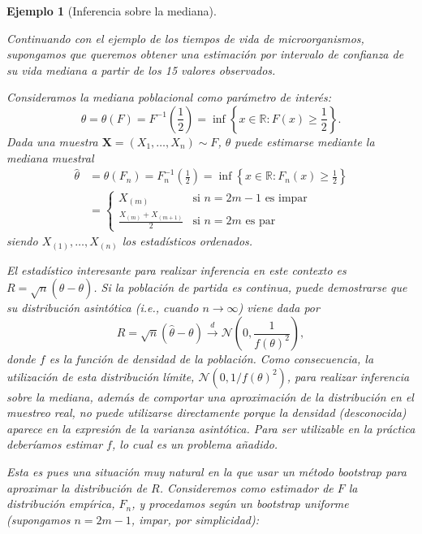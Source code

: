\documentclass[
]{book}
\renewcommand{\mathbf}[1]{\symbf{#1}}
\theoremstyle{break}
\newtheorem{example}{Ejemplo}[chapter]
\theoremstyle{nonumberplain}
\begin{document}
\begin{example}[Inferencia sobre la mediana]
\protect\hypertarget{exm:mediana}{}\label{exm:mediana} \vspace{0.5cm}

Continuando con el ejemplo de los tiempos de vida de microorganismos,
supongamos que queremos obtener una estimación por intervalo de confianza
de su vida mediana a partir de los 15 valores observados.

Consideramos la mediana poblacional como parámetro de interés:
\[\theta = \theta \left( F \right) = F^{-1}\left( \frac{1}{2} \right) 
= \inf \left\{ x\in \mathbb{R} : F\left( x \right) \geq \frac{1}{2}\right\}.\]
Dada una muestra \(\mathbf{X}=\left( X_1,\ldots ,X_n \right) \sim
F\), \(\theta\) puede estimarse mediante la mediana muestral
\[\begin{aligned}
\hat{\theta} &= \theta \left( F_n \right) =F_n^{-1}\left( \frac{1}{2} \right) 
=\inf \left\{ x\in \mathbb{R} : F_n\left( x \right) \geq \frac{1}{2}
\right\} \\
&= \left\{ 
\begin{array}{ll}
X_{(m)} & \text{si } n=2m-1 \text{ es impar} \\ 
\frac{X_{(m)}+X_{\left( m+1 \right)}}{2} & \text{si } n=2m \text{ es par}
\end{array}
\right.
\end{aligned}\]
siendo \(X_{(1)},\ldots ,X_{(n)}\) los estadísticos ordenados.

El estadístico interesante para realizar inferencia en este contexto es
\(R=\sqrt{n}\left( \hat{\theta}-\theta \right)\). Si la población de
partida es continua, puede demostrarse que su distribución asintótica
(i.e., cuando \(n \rightarrow \infty\)) viene dada por
\[R=\sqrt{n}\left( \hat{\theta}-\theta \right) \overset{d}{\rightarrow }
\mathcal{N}\left( 0,\frac{1}{f\left( \theta \right)^2} \right),\]donde \(f\) es
la función de densidad de la población. Como consecuencia, la
utilización de esta distribución límite,
\(\mathcal{N}\left( 0, 1/f\left( \theta \right)^2 \right)\), para realizar
inferencia sobre la mediana, además de comportar una aproximación de la
distribución en el muestreo real, no puede utilizarse directamente
porque la densidad (desconocida) aparece en la expresión de la varianza
asintótica. Para ser utilizable en la práctica deberíamos estimar \(f\),
lo cual es un problema añadido.

Esta es pues una situación muy natural en la que usar un método
bootstrap para aproximar la distribución de \(R\). Consideremos como
estimador de \(F\) la distribución empírica, \(F_n\), y procedamos según
un bootstrap uniforme (supongamos \(n=2m-1\), impar, por simplicidad):


\end{example}
\end{document}
